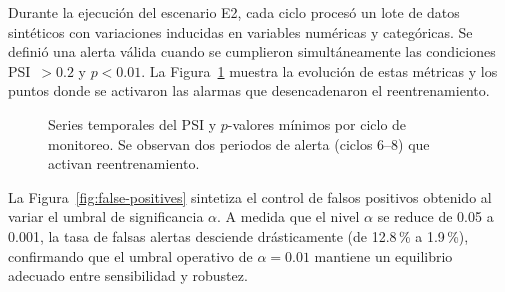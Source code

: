 \vspace{0.2cm}

Durante la ejecución del escenario E2, cada ciclo procesó un lote de datos sintéticos con variaciones inducidas en variables numéricas y categóricas. 
Se definió una alerta válida cuando se cumplieron simultáneamente las condiciones PSI~$>0.2$ y $p<0.01$. 
La Figura~\ref{fig:psi-pval-series} muestra la evolución de estas métricas y los puntos donde se activaron las alarmas que desencadenaron el reentrenamiento.

\begin{figure}[htbp]
\centering
{}
\caption[Series temporales del PSI y $p$-valores mínimos]{Series temporales del PSI y $p$-valores mínimos por ciclo de monitoreo. 
Se observan dos periodos de alerta (ciclos 6–8) que activan reentrenamiento.}
\label{fig:psi-pval-series}
\end{figure}

\vspace{0.3cm}

La Figura~\ref{fig:false-positives} sintetiza el control de falsos positivos obtenido al variar el umbral de significancia $\alpha$. 
A medida que el nivel $\alpha$ se reduce de 0.05 a 0.001, la tasa de falsas alertas desciende drásticamente (de 12.8\,\% a 1.9\,\%), confirmando que el umbral operativo de $\alpha=0.01$ mantiene un equilibrio adecuado entre sensibilidad y robustez.

